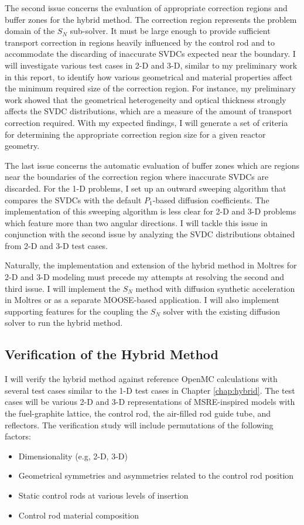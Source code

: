 The second issue concerns the evaluation of appropriate correction regions and buffer zones for the
hybrid method. The correction region represents the problem domain of the $S_N$ sub-solver. It must
be large enough to provide sufficient transport correction in regions heavily influenced by the
control rod and to accommodate the discarding of inaccurate \glspl{SVDC} expected near the
boundary. I will investigate various test cases in 2-D and 3-D, similar to my preliminary work in
this report, to identify how various geometrical and material properties affect the minimum
required size of the correction region. For instance, my preliminary work showed that the
geometrical heterogeneity and optical thickness strongly affects the \gls{SVDC} distributions,
which are a measure of the amount of transport correction required. With my expected findings, I
will generate a set of criteria for determining the appropriate correction region size for a given
reactor geometry.

The last issue concerns the automatic evaluation of buffer zones which are regions near the
boundaries of the correction region where inaccurate \glspl{SVDC} are discarded. For the 1-D
problems, I set up an outward sweeping algorithm that compares the \glspl{SVDC} with the default
$P_1$-based diffusion coefficients. The implementation of this sweeping algorithm is less clear for
2-D and 3-D problems which feature more than two angular directions. I will tackle this issue
in conjunction with the second issue by analyzing the \gls{SVDC} distributions obtained from
2-D and 3-D test cases.

Naturally, the implementation and extension of the hybrid method in Moltres for 2-D and 3-D
modeling must precede my attempts at resolving the second and third issue. I will implement the
$S_N$ method with diffusion synthetic acceleration in Moltres or as a separate MOOSE-based
application. I will also implement supporting features for the coupling the $S_N$ solver with the
existing diffusion solver to run the hybrid method.

\subsection{Verification of the Hybrid Method}

I will verify the hybrid method against reference OpenMC calculations with several test cases
similar to the 1-D test cases in Chapter \ref{chap:hybrid}. The test cases will be various 2-D
and 3-D representations of \gls{MSRE}-inspired models with the fuel-graphite lattice, the control
rod, the air-filled rod guide tube, and reflectors. The verification study will include
permutations of the following factors:
%
\begin{itemize}
  \item Dimensionality (e.g, 2-D, 3-D)
  \item Geometrical symmetries and asymmetries related to the control rod position
  \item Static control rods at various levels of insertion
  \item Control rod material composition
\end{itemize}

